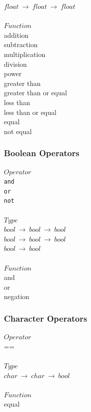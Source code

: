 \documentclass[5pt]{article}
\begin{document}
\begin{multicols}{3}
$float \ \rightarrow \ float \ \rightarrow \ float $ \\
\columnbreak \\
$Function$ \\
addition \\
subtraction \\
multiplication \\
division \\
power \\
greater than \\
greater than or equal \\
less than \\
less than or equal \\
equal \\
not equal \\
\end{multicols}
\newpage
\subsubsection{Boolean Operators}
\begin{multicols}{3}
\noindent $Operator$ \\
\hspace*{5mm} \texttt{and} \\
\hspace*{5mm} \texttt{or} \\
\hspace*{5mm} \texttt{not} \\
\columnbreak \\
\noindent $Type$ \\
$bool \ \rightarrow \ bool \ \rightarrow \ bool $ \\
$bool \ \rightarrow \ bool \ \rightarrow \ bool $ \\
$bool \ \rightarrow \ bool $ \\
\columnbreak \\
\noindent $Function$ \\
and \\
or \\
negation \\
\end{multicols}
\subsubsection{Character Operators}
\begin{multicols}{3}
\noindent $Operator$ \\
\hspace*{5mm} == \\
\columnbreak \\
\noindent $Type$ \\
$char \ \rightarrow \ char \ \rightarrow \ bool $ \\
\columnbreak \\
\noindent $Function$ \\
equal \\
\end{multicols}
\end{document}

